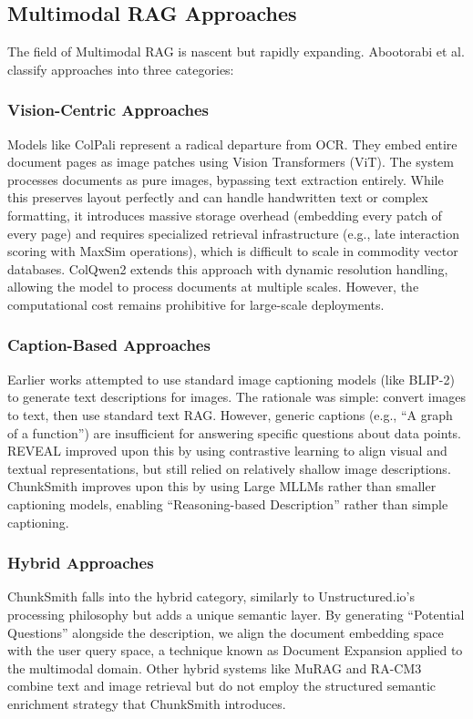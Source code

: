 \documentclass[conference]{IEEEtran}
\begin{document}
\subsection{Multimodal RAG Approaches}
The field of Multimodal RAG is nascent but rapidly expanding. Abootorabi et al. \cite{abootorabi2025ask} classify approaches into three categories:
\subsubsection{Vision-Centric Approaches}
Models like ColPali \cite{faysse2024colpali} represent a radical departure from OCR. They embed entire document pages as image patches using Vision Transformers (ViT). The system processes documents as pure images, bypassing text extraction entirely. While this preserves layout perfectly and can handle handwritten text or complex formatting, it introduces massive storage overhead (embedding every patch of every page) and requires specialized retrieval infrastructure (e.g., late interaction scoring with MaxSim operations), which is difficult to scale in commodity vector databases.
ColQwen2 extends this approach with dynamic resolution handling, allowing the model to process documents at multiple scales. However, the computational cost remains prohibitive for large-scale deployments.
\subsubsection{Caption-Based Approaches}
Earlier works \cite{hu2023reveal} attempted to use standard image captioning models (like BLIP-2) to generate text descriptions for images. The rationale was simple: convert images to text, then use standard text RAG. However, generic captions (e.g., ``A graph of a function'') are insufficient for answering specific questions about data points. 
REVEAL \cite{hu2023reveal} improved upon this by using contrastive learning to align visual and textual representations, but still relied on relatively shallow image descriptions. ChunkSmith improves upon this by using Large MLLMs rather than smaller captioning models, enabling ``Reasoning-based Description'' rather than simple captioning.
\subsubsection{Hybrid Approaches}
ChunkSmith falls into the hybrid category, similarly to Unstructured.io's processing philosophy but adds a unique semantic layer. By generating ``Potential Questions'' alongside the description, we align the document embedding space with the user query space, a technique known as Document Expansion \cite{nogueira2019document} applied to the multimodal domain.
Other hybrid systems like MuRAG \cite{chen2022murag} and RA-CM3 \cite{yasunaga2023retrieval} combine text and image retrieval but do not employ the structured semantic enrichment strategy that ChunkSmith introduces.
\end{document}

